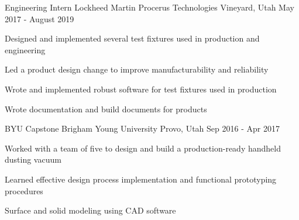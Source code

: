\begin{cventries}

  \cventry
    {Engineering Intern} %
    {Lockheed Martin Procerus Technologies} %
    {Vineyard, Utah} %
    {May 2017 - August 2019} %
    {
    \begin{cvitems}
      \item{Designed and implemented several test fixtures used in production and engineering}
      \item{Led a product design change to improve manufacturability and reliability}
      \item{Wrote and implemented robust software for test fixtures used in production}
      \item{Wrote documentation and build documents for products}
    \end{cvitems}
    }



  \cventry
    {BYU Capstone} %
    {Brigham Young University} %
    {Provo, Utah} %
    {Sep 2016 - Apr 2017} %
    {
      \begin{cvitems} %
        \item {Worked with a team of five to design and build a production-ready handheld dusting vacuum}
        \item {Learned effective design process implementation and functional prototyping procedures}
        \item {Surface and solid modeling using CAD software}
      \end{cvitems}
    }


\end{cventries}
